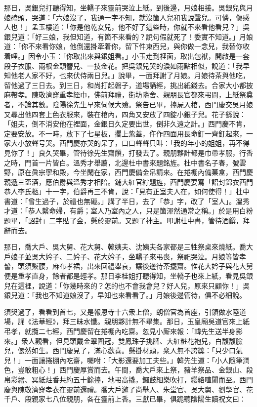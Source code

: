 那日，吳銀兒打聽得知，坐轎子來靈前哭泣上紙。到後邊，月娘相接。吳銀兒與月娘磕頭，哭道：「六娘沒了，我通一字不知，就沒箇人兒和我說聲兒。可憐，傷感人也！」孟玉樓道：「你是他乾女兒，他不好了這些時，你就不來看他看兒？」吳銀兒道：「好三娘，我但知道，有箇不來看的？說句假就死了！委實不知道。」月娘道：「你不來看你娘，他倒還掛牽着你，留下件東西兒，與你做一念兒，我替你收着哩。」因令小玉：「你取出來與銀姐看。」小玉走到裡面，取出包袱，開啟是一套段子衣服、兩根金頭簪兒、一技金花。把吳銀兒哭的淚如雨點相似，{}說道：「我早知他老人家不好，也來伏侍兩日兒。」說畢，一面拜謝了月娘。月娘待茶與他吃，留他過了三日去。到三日，和尚打起磐子，道場誦經，挑出紙錢去。合家大小都披麻帶孝。陳敬濟穿重孝絰巾，佛前拜禮，街坊隣舍、親朋長官都來弔問，上紙祭奠者，不論其數。陰陽徐先生早來伺候大殮。祭告已畢，擡屍入棺，西門慶交吳月娘又尋出他四套上色衣服來，裝在棺內，四角又安放了四錠小銀子兒。花子繇說：「姐夫，倒不消安他在裡面，金銀日久定要出世，倒非久遠之計。」西門慶不肯，定要安放。不一時，放下了七星板，擱上紫蓋，仵作四面用長命釘一齊釘起來，一家大小放聲号哭。西門慶亦哭的呆了，口口聲聲只叫：「我的年小的姐姐，再不得見你了！」良久哭畢，管待徐先生齋饌，打發去了。親朋夥計都是巾帶孝服，行香之時，門首一片皆白。溫秀才舉薦，北邊杜中書來題銘旌。杜中書名子春，號雲野，原在眞宗寧和殿，今坐閑在家，西門慶備金帛請來。在捲棚內備菓盒，西門慶親遞三盃酒，應伯爵與溫秀才相陪。鋪大紅官紵題旌，西門慶要寫「詔封錦衣西門恭人李氏柩」十一字，伯爵再三不肯，說：「見有正室夫人在，如何使得！」{}杜中書道：「曾生過子，於禮也無礙。」講了半日，去了「恭」字，改了「室人」。溫秀才道：「恭人繫命婦，有爵；室人乃室內之人，只是箇渾然通常之稱。」於是用白粉題畢，「詔封」二字貼了金，懸於靈前。又題了神主。叩謝杜中書，管待酒饌，拜辭而去。

那日，喬大戶、吳大舅、花大舅、韓姨夫、沈姨夫各家都是三牲祭桌來燒紙。喬大戶娘子並吳大妗子、二妗子、花大妗子，坐轎子來弔䘮，祭祀哭泣。月娘等皆孝髻，頭須繫腰，麻布孝裙，出來回禮舉哀，讓後邊待茶擺齋。惟花大妗子與花大舅便是重孝直身，餘者都是輕孝。那日李桂姐打聽得知，坐轎子也來上紙，看見吳銀兒在這裡，說道：「你幾時來的？怎的也不會我會兒？好人兒，原來只顧你！」吳銀兒道：「我也不知道娘沒了，早知也來看看了。」月娘後邊管待，俱不必細說。

須臾過了，看看到首七，又是報恩寺十六衆上僧，朗僧官為首座，引領做水陸道場，誦《法華經》，拜三昧水懺。親朋夥計無不畢集。那日，玉皇廟吳道官來上紙弔孝，就攬二七經，西門慶留在捲棚內吃齋。忽見小厮來報：「韓先生送半身影來。」衆人觀看，但見頭戴金翠圍冠，雙鳳珠子挑牌、大紅粧花袍兒，白馥馥臉兒，儼然如生。西門慶見了，滿心歡喜。懸掛材頭，衆人無不誇獎：「只少口氣兒！」一面讓捲棚內吃齋，囑咐：「大影還要加工夫些。」韓先生道：「小人隨筆潤色，豈敢粗心！」西門慶厚賞而去。午間，喬大戶來上祭，豬羊祭品、金銀山、段帛彩繒、冥紙炷香共約五十餘擡，地弔高撬，鑼鼓細樂吹打，纓絡喧闐而至。西門慶與陳敬濟穿孝衣在靈前還禮。喬大戶邀了尚舉人、朱堂官、吳大舅、劉學官、花千戶、段親家七八位親朋，各在靈前上香。三獻已畢，俱跪聽陰陽生讀祝文曰：

